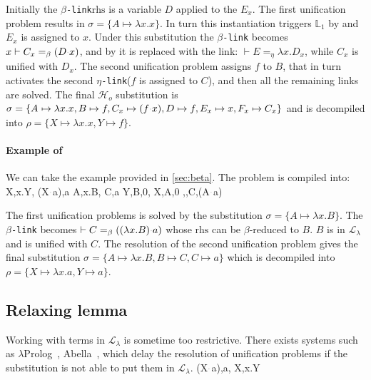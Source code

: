 \documentclass[sigconf,natbib=false,review]{acmart}
\newcommand{\appsep}{\ensuremath{\textcolor{lightgray}{\cdot}}}
\newcommand{\llambda}{\ensuremath{\mathcal{L}_\lambda}\xspace}
\newcommand{\linkMacro}[1]{\ensuremath{#1}\texttt{-link}\xspace}
\newcommand{\linkbeta}{\linkMacro{\beta}}
\newcommand{\linketa} {\linkMacro{\eta}}
\newcommand{\Ho}{\ensuremath{\mathcal{H}_o}\xspace}
\newcommand{\linketaM}[3]{\ensuremath{#1 \vdash #2 =_\eta #3}}
\newcommand{\linkbetaM}[3]{\ensuremath{#1 \vdash #2 =_\beta #3}}
\newcommand{\rhs}{\ensuremath{\mathrm{rhs}}\xspace}
\newcommand{\linkStore}{\ensuremath{\mathbb{L}}\xspace}
\begin{document}
\noindent
Initially the \linkbeta \rhs is a variable $D$ applied to the $E_x$.
The first unification problem results in $\sigma =
\{A \mapsto \lambda x.x\}$. In turn this instantiation
triggers $\linkStore_1$ by \progressetaleft 
and $E_x$ is assigned to $x$.
Under this substitution the \linkbeta becomes
\linkbetaM{x}{C_x}{(D \appsep x)}, and by \progBetaLL
it is replaced with the link:
\linketaM{}{E}{\lambda x.D_x}, while $C_x$ is unified with $D_x$. The second unification
problem assigns $f$ to $B$, that in turn activates
the second \linketa ($f$ is assigned to $C$), and then all the remaining links
are solved. The final \Ho substitution is $\sigma = \{A _{} \mapsto \lambda x.x, 
B _{} \mapsto f, C _{x} \mapsto (f\appsep x), 
D _{} \mapsto f, E _{x} \mapsto x, F _{x} \mapsto C_{x} \}$ and is decompiled into $\rho = \{X \mapsto \lambda x.x,
Y \mapsto f\}$.

\paragraph{Example of \progBetaRH}
We can take the example provided in \cref{sec:beta}. The problem is compiled
into:
%
\printAlll
  {{{X,\lambda x.Y},
    {(X\appsep a),a}}}
  {{{A,\lambda x.B},
    {C,a}}}
  {{{Y,B,0},
    {X,A,0}}}
  {{{\beta,,C,(A\appsep a)}}}

The first unification problems is solved by the substitution $\sigma = \{A
\mapsto \lambda x.B\}$. The \linkbeta becomes
\linkbetaM{}{C}{((\lambda x.B) \appsep a)} whose \rhs can be $\beta$-reduced to
$B$. $B$ is in \llambda and is unified with $C$. The resolution of the second
unification problem
gives the final substitution $\sigma = \{A \mapsto \lambda x.B, B \mapsto C, C
\mapsto a\}$ which is decompiled into $\rho = \{X \mapsto \lambda x.a, Y \mapsto
a\}$.
 
\subsection{Relaxing lemma }

\newcommand{\progBetaNoLLWait}{\emph{progress-beta-\notllambda}}

Working with terms in \llambda is sometime too restrictive. There exists systems
such as $\lambda$Prolog~\cite{lamProlog}, Abella~\cite{gacek2008abella}, which 
delay the resolution of \notllambda unification problems if the substitution
is not able to put them in \llambda.
%
\printAlll
  {{{(X\appsep a),a},
    {X,\lambda x.Y}}}
  {{}}
  {{}}
  {{}}
\end{document}
